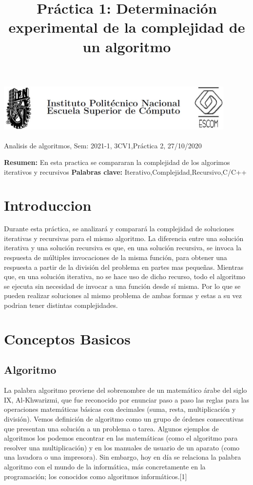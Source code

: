 \documentclass[spanish]{article}
\title {Práctica 1: Determinación experimental de la complejidad de un algoritmo}
\begin{document}
	\centerline{\includegraphics[width=450px,height=100px]{../img/header}}
	\centerline{Analisis de algoritmos, Sem: 2021-1, 3CV1,Práctica  2, 27/10/2020}
	\centerline{}
	\bigskip
	\justify
	\textbf{Resumen:}	
	En esta practica se compararan la complejidad de los algorimos iterativos y recursivos
	\textbf{Palabras clave:}
	Iterativo,Complejidad,Recursivo,C/C++
	\section{Introduccion}
	Durante esta práctica, se analizará y comparará la complejidad de soluciones iterativas y recursivas para el mismo algoritmo. La diferencia entre una solución iterativa y una solución recursiva es que, en una solución recursiva, se invoca la respuesta de múltiples invocaciones de la misma función, para obtener una respuesta a partir de la división del problema en partes mas pequeñas. Mientras que, en una solución iterativa, no se hace uso de dicho recurso, todo el algoritmo se ejecuta sin necesidad de invocar a una función desde sí misma. Por lo que se pueden realizar soluciones al mismo problema de ambas formas y estas a su vez podrian tener distintas complejidades.
	\section{Conceptos Basicos}
	\subsection{Algoritmo}
	La palabra algoritmo proviene del sobrenombre de un matemático árabe del siglo IX, Al-Khwarizmi, que fue reconocido por enunciar paso a paso las reglas para las operaciones matemáticas básicas con decimales (suma, resta, multiplicación y división).	
	Vemos definición de algoritmo como un grupo de órdenes consecutivas que presentan una solución a un problema o tarea. Algunos ejemplos de algoritmos los podemos encontrar en las matemáticas (como el algoritmo para resolver una multiplicación) y en los manuales de usuario de un aparato (como una lavadora o una impresora).	
	Sin embargo, hoy en día se relaciona la palabra algoritmo con el mundo de la informática, más concretamente en la programación; los conocidos como algoritmos informáticos.[1]
\end{document}
